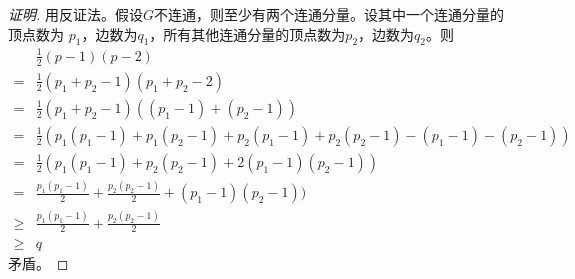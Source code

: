 \begin{proof}[证明]
      用反证法。假设$G$不连通，则至少有两个连通分量。设其中一个连通分量的顶点数为
    $p_1$，边数为$q_1$，所有其他连通分量的顶点数为$p_2$，边数为$q_2$。则
    \begin{equation*}
      \begin{split}
        &\frac{1}{2}(p-1)(p-2)\\
        =&\frac{1}{2}(p_1 + p_2 -1)(p_1 + p_2 -2)\\
        =&\frac{1}{2}(p_1 + p_2 -1)((p_1 - 1) + (p_2 - 1))\\
        =&\frac{1}{2}(p_1(p_1 -1) +  p_1(p_2 - 1) + p_2(p_1 - 1) + p_2(p_2-1) - (p_1 - 1) - (p_2-1))\\
        =&\frac{1}{2}(p_1(p_1 -1) +   p_2(p_2-1) + 2(p_1 - 1)(p_2-1))\\
        =&\frac{p_1(p_1 -1)}{2} +   \frac{p_2(p_2-1)}{2} + (p_1 - 1)(p_2-1))\\
        \geq&\frac{p_1(p_1 -1)}{2} +   \frac{p_2(p_2-1)}{2}\\
        \geq & q
      \end{split}
    \end{equation*}
    矛盾。
\end{proof}
